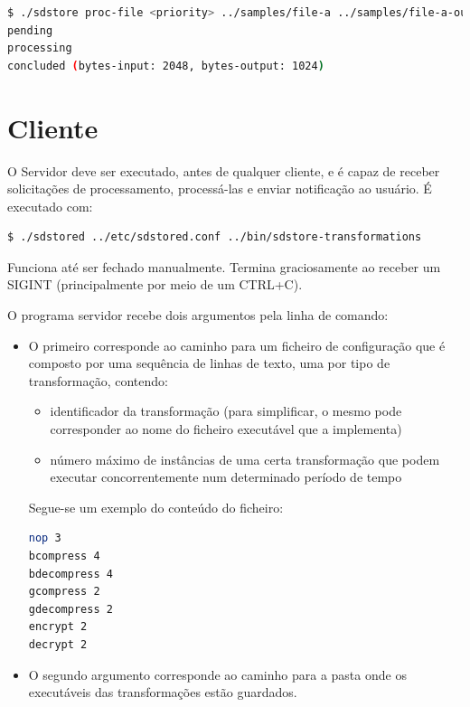\documentclass[a4paper]{report}
\begin{document}
    \begin{lstlisting}[language=bash,caption={}]
$ ./sdstore proc-file <priority> ../samples/file-a ../samples/file-a-output bcompress nop gcompress encrypt nop
pending
processing
concluded (bytes-input: 2048, bytes-output: 1024)
\end{lstlisting}

    \section{Cliente}
    O Servidor deve ser executado, antes de qualquer cliente, e é capaz de receber solicitações de processamento, processá-las e enviar notificação ao usuário. É executado com:
\begin{lstlisting}[language=bash,caption={}]
$ ./sdstored ../etc/sdstored.conf ../bin/sdstore-transformations
\end{lstlisting}

    Funciona até ser fechado manualmente. Termina graciosamente ao receber um SIGINT (principalmente por meio de um CTRL+C).
    
    O programa servidor recebe dois argumentos pela linha de comando: 
    
    \begin{itemize}
        \item O primeiro corresponde ao caminho para um ficheiro de configuração que é composto por uma sequência de linhas de texto, uma por tipo de transformação, contendo:
        \begin{itemize}
            \item identificador da transformação (para simplificar, o mesmo pode corresponder ao nome do ficheiro executável que a implementa)
            \item número máximo de instâncias de uma certa transformação que podem executar concorrentemente num determinado período de tempo
        
        \end{itemize}
            Segue-se um exemplo do conteúdo do ficheiro:
    
    \begin{lstlisting}[language=bash,caption={}]
nop 3
bcompress 4
bdecompress 4
gcompress 2
gdecompress 2
encrypt 2
decrypt 2

\end{lstlisting}

    \item O segundo argumento corresponde ao caminho para a pasta onde os executáveis das transformações estão guardados.

    \end{itemize}
\end{document}
